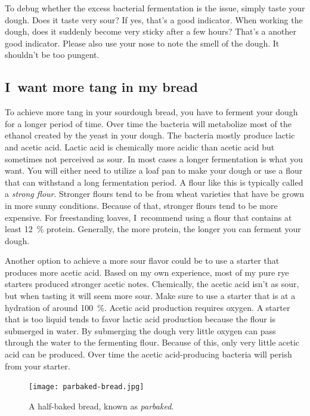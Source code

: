 To debug whether the excess bacterial fermentation is the issue,
simply taste your dough. Does it taste very sour? If yes,
that's a good indicator. When working the dough, does it
suddenly become very sticky after a few hours? That's a
another good indicator. Please also use your nose to note
the smell of the dough. It shouldn't be too pungent.

\subsection{I~want more tang in my bread}

To achieve more tang in your sourdough bread, you have
to ferment your dough for a longer period of time.
Over time the bacteria will metabolize most of the
ethanol created by the yeast in your dough. The bacteria
mostly produce lactic and acetic acid. Lactic acid
is chemically more acidic than acetic acid but sometimes
not perceived as sour. In most cases a longer fermentation
is what you want. You will either need to utilize a loaf
pan to make your dough or use a flour that can withstand
a long fermentation period. A flour like this is typically
called a \emph{strong flour}. Stronger flours tend
to be from wheat varieties that have be grown in more
sunny conditions. Because of that, stronger flours tend
to be more expensive. For freestanding loaves, I~recommend
using a flour that contains at least \qty{12}{\percent} protein.
Generally, the more protein, the longer you can ferment your dough.

Another option to achieve a more sour flavor could be to
use a starter that produces more acetic acid. Based on my own
experience, most of my pure rye starters produced stronger acetic
notes. Chemically, the acetic acid isn't as sour, but when tasting
it will seem more sour. Make sure to use a starter that is at
a hydration of around \qty{100}{\percent}. Acetic acid production
requires oxygen. A starter that is too liquid tends to favor lactic
acid production because the flour is submerged in water. By submerging
the dough very little oxygen can pass through the water to the fermenting flour.
Because of this, only very little acetic acid can be produced. Over
time the acetic acid-producing bacteria will perish from your starter.

\begin{figure}[!htb]
  \texttt{[image: parbaked-bread.jpg]}
  \caption[Half-baked bread]{A half-baked bread, known as \emph{parbaked}.}%
  \label{fig:parbaked-bread}
\end{figure}

